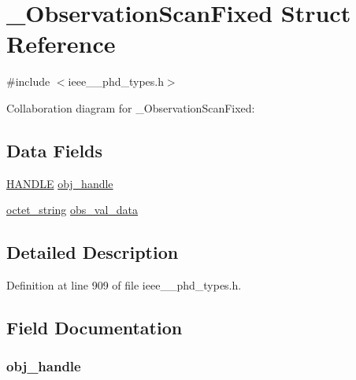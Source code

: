 \hypertarget{struct___observation_scan_fixed}{}\section{\+\_\+\+Observation\+Scan\+Fixed Struct Reference}
\label{struct___observation_scan_fixed}


{\ttfamily \#include $<$ieee\+\_\+\_\+phd\+\_\+types.\+h$>$}



Collaboration diagram for \+\_\+\+Observation\+Scan\+Fixed\+:
\subsection*{Data Fields}
\begin{DoxyCompactItemize}
\item 
\hyperlink{ieee__11073__phd__types_8h_a76f0d44d294babf2e568f7ee676ffca6}{H\+A\+N\+D\+L\+E} \hyperlink{struct___observation_scan_fixed_abbfff52b7a4956021522f5750c4b32c6}{obj\+\_\+handle}
\item 
\hyperlink{ieee__11073__phd__types_8h_a5524261dd425fc0bd90c9d87277b7127}{octet\+\_\+string} \hyperlink{struct___observation_scan_fixed_accb40693f89811b00b0a93b4bce000d4}{obs\+\_\+val\+\_\+data}
\end{DoxyCompactItemize}


\subsection{Detailed Description}


Definition at line 909 of file ieee\+\_\+\_\+phd\+\_\+types.\+h.



\subsection{Field Documentation}
\hypertarget{struct___observation_scan_fixed_abbfff52b7a4956021522f5750c4b32c6}{}
\subsubsection[{obj\+\_\+handle}]{ obj\+\_\+handle}\label{struct___observation_scan_fixed_abbfff52b7a4956021522f5750c4b32c6}


